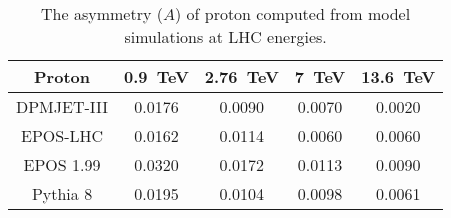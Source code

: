 


%

\begin{table*}[!htb]
{
\begin{center}
\caption{The asymmetry ($A$) of proton computed from model simulations at LHC energies.}

\begin{tabular}{ccccc}\\ \hline \hline
Proton&0.9~TeV&  2.76~TeV & 7~TeV & 13.6~TeV \\
   \hline
     DPMJET-III& 0.0176&	0.0090&	0.0070&	0.0020  \\
     EPOS-LHC& 0.0162	&0.0114&0.0060&	0.0060\\
    EPOS 1.99   &0.0320&	0.0172&	0.0113&	0.0090\\
    Pythia 8 & 0.0195& 0.0104&	0.0098&	0.0061 \\
    \hline\hline

    
    
     

\end{tabular}
\end{center}}
\end{table*}
